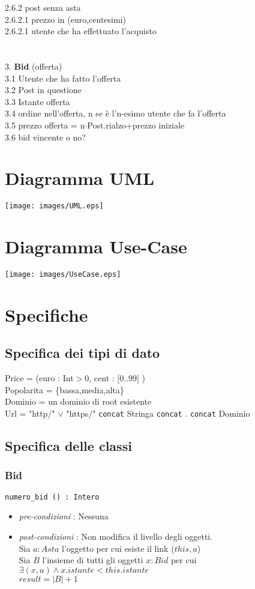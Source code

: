 \documentclass[12pt, letterpaper]{article}
\newcommand{\acc}{\\\hphantom{}\\}
\newcommand{\code}[1]{\colorbox{light-gray}{\texttt{#1}}}
\newcommand{\codee}[1]{\colorbox{white}{\texttt{#1}}}
\newcommand{\id}{{\hphantom{ident}}}
\begin{document}
\id\id	2.6.2 post senza asta\\
        \id\id\id		2.6.2.1 prezzo in (euro,centesimi)\\
        \id\id\id		2.6.2.1 utente che ha effettuato l'acquisto\\
\acc
3. \textbf{Bid} (offerta)\\
\id	3.1 Utente che ha fatto l'offerta\\
\id	3.2 Post in questione\\
    \id	3.3 Istante offerta \\
    \id	3.4 ordine nell'offerta, n se è l'n-esimo utente che fa l'offerta\\
    \id	3.5 prezzo offerta = n$\cdot$Post.rialzo+prezzo iniziale\\
    \id	3.6 bid vincente o no?\\
\section{Diagramma UML}\begin{center}
    \texttt{[image: images/UML.eps]}
\end{center}
\newpage
\section{Diagramma Use-Case}\begin{center}
    \texttt{[image: images/UseCase.eps]}
\end{center}
\newpage
\section{Specifiche}
\subsection{Specifica dei tipi di dato}
Price = (euro : Int$>$0, cent : $[$0..99$]$ ) \\ 
Popolarita = \{bassa,media,alta\}\\ 
Dominio = un dominio di root esistente\\
Url = "http/" $\lor$ "https/" \codee{concat} Stringa \codee{concat} . \codee{concat} Dominio \\
\subsection{Specifica delle classi}
\subsubsection{Bid}
\code{numero\_bid () : Intero}\begin{itemize}
    \item \textit{pre-condizioni} : Nessuna
    \item \textit{post-condizioni} : Non modifica il livello degli oggetti.\\ 
    Sia $a:Asta$ l'oggetto per cui esiste il link ($this,a$)\\ 
    Sia $B$ l'insieme di tutti gli oggetti $x:Bid$ per cui $\exists (x,a) \land x.istante<this.istante$\\ 
    $result = |B|+1$ 
\end{itemize}
\end{document}
